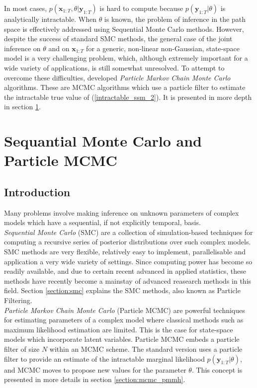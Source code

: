 \documentclass[11pt,a4,twosided,singlespacing,titlepagenumber=on]{scrreprt}
\numberwithin{equation}{chapter} %
\theoremstyle{remark}
\newcommand{\matr}[1]{\mathbf{#1}}
\begin{document}
In most cases, $p(\matr{x}_{1:T}, \theta | \matr{y}_{1:T})$ is hard to compute because $p(\matr{y}_{1:T} | \theta)$ is analytically intractable. When $\theta$ is known, the problem of inference in the path space is effectively addressed using Sequential Monte Carlo methods. However, despite the success of standard SMC methods, the general case of the joint inference on $\theta$ and on $\matr{x}_{1:T}$ for a generic, non-linear non-Gaussian, state-space model is a very challenging problem, which, although extremely important for a wide variety of applications, is still somewhat unresolved. To attempt to overcome these difficulties, \cite{andrieu2010} developed \textit{Particle Markov Chain Monte Carlo} algorithms. These are MCMC algorithms which use a particle filter to estimate the intractable true value of (\ref{intractable_ssm_2}). It is presented in more depth in section \ref{section:pmcmc}.


\chapter{Sequantial Monte Carlo and Particle MCMC}
\label{section:pmcmc}
\section{Introduction}
Many problems involve making inference on unknown parameters of complex models which have a sequential, if not explicitly temporal, basis. \\

\textit{Sequential Monte Carlo} (SMC) are a collection of simulation-based techniques for computing a recursive series of posterior distributions over such complex models. SMC methods are very flexible, relatively easy to implement, parallelisable and application a very wide variety of settings. Since computing power has become so readily available, and due to certain recent advanced in applied statistics, these methods have recently become a mainstay of advanced reasearch methods in this field. Section \ref{section:smc} explains the SMC methods, also known as Particle Filtering. \\

\textit{Particle Markov Chain Monte Carlo} (Particle MCMC) are powerful techniques for estimating parameters of a complex model where classical methods such as maximum likelihood estimation are limited. This is the case for state-space models which incorporate latent variables. Particle MCMC embeds a particle filter of size $N$ within an MCMC scheme. The standard version uses a particle filter to provide an estimate of the intractable marginal likelihood $p(\matr{y}_{1:T}|\theta)$, and MCMC moves to propose new values for the parameter $\theta$. This concept is presented in more details in section \ref{section:mcmc_pmmh}.
\end{document}
